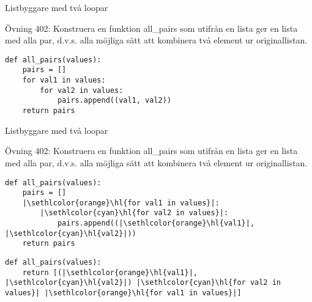 \begin{frame}[fragile]{Listbyggare med två loopar}

  Övning 402: Konstruera en funktion all\_pairs som utifrån en lista ger en lista
  med alla par, d.v.s. alla möjliga sätt att kombinera två element ur
  originallistan.

  \begin{lstlisting}
def all_pairs(values):
    pairs = []
    for val1 in values:
        for val2 in values:
            pairs.append((val1, val2))
    return pairs
  \end{lstlisting}

  \vspace{2.35\baselineskip} %

\end{frame}

\begin{frame}[fragile]{Listbyggare med två loopar}

  Övning 402: Konstruera en funktion all\_pairs som utifrån en lista ger en lista
  med alla par, d.v.s. alla möjliga sätt att kombinera två element ur
  originallistan.

  \begin{lstlisting}
def all_pairs(values):
    pairs = []
    |\sethlcolor{orange}\hl{for val1 in values}|:
        |\sethlcolor{cyan}\hl{for val2 in values}|:
            pairs.append((|\sethlcolor{orange}\hl{val1}|, |\sethlcolor{cyan}\hl{val2}|))
    return pairs
  \end{lstlisting}

  \pause{}

  \begin{lstlisting}
def all_pairs(values):
    return [(|\sethlcolor{orange}\hl{val1}|, |\sethlcolor{cyan}\hl{val2}|) |\sethlcolor{cyan}\hl{for val2 in values}| |\sethlcolor{orange}\hl{for val1 in values}|]
  \end{lstlisting}

\end{frame}

